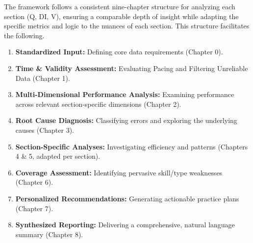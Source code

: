 \documentclass{article}
\begin{document}
The framework follows a consistent nine-chapter structure for analyzing each section (Q, DI, V), ensuring a comparable depth of insight while adapting the specific metrics and logic to the nuances of each section. This structure facilitates the following.

\begin{enumerate}
    \item \textbf{Standardized Input:} Defining core data requirements (Chapter 0).
    \item \textbf{Time \& Validity Assessment:} Evaluating Pacing and Filtering Unreliable Data (Chapter 1).
    \item \textbf{Multi-Dimensional Performance Analysis:} Examining performance across relevant section-specific dimensions (Chapter 2).
    \item \textbf{Root Cause Diagnosis:} Classifying errors and exploring the underlying causes (Chapter 3).
    \item \textbf{Section-Specific Analyses:} Investigating efficiency and patterns (Chapters 4 \& 5, adapted per section).
    \item \textbf{Coverage Assessment:} Identifying pervasive skill/type weaknesses (Chapter 6).
    \item \textbf{Personalized Recommendations:} Generating actionable practice plans (Chapter 7).
    \item \textbf{Synthesized Reporting:} Delivering a comprehensive, natural language summary (Chapter 8).
\end{enumerate}
\end{document}
